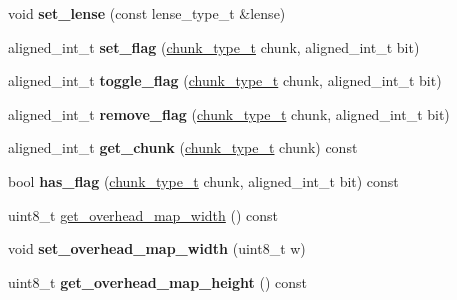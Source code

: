 \begin{DoxyCompactItemize}
void {\bfseries set\+\_\+lense} (const lense\+\_\+type\+\_\+t \&lense)
\item 
\mbox{\label{classmods_1_1player_a5ae234a904fde59efe863101c0fa8569}} 
aligned\+\_\+int\+\_\+t {\bfseries set\+\_\+flag} (\hyperlink{classmods_1_1player_a98e6f1c1529e3034d1c6e9a48475bc6b}{chunk\+\_\+type\+\_\+t} chunk, aligned\+\_\+int\+\_\+t bit)
\item 
\mbox{\label{classmods_1_1player_a8e3f6ee3fec9c25cdfbc8900dd7dd8de}} 
aligned\+\_\+int\+\_\+t {\bfseries toggle\+\_\+flag} (\hyperlink{classmods_1_1player_a98e6f1c1529e3034d1c6e9a48475bc6b}{chunk\+\_\+type\+\_\+t} chunk, aligned\+\_\+int\+\_\+t bit)
\item 
\mbox{\label{classmods_1_1player_ac82ced6921af9adc44e20e8d35bb423f}} 
aligned\+\_\+int\+\_\+t {\bfseries remove\+\_\+flag} (\hyperlink{classmods_1_1player_a98e6f1c1529e3034d1c6e9a48475bc6b}{chunk\+\_\+type\+\_\+t} chunk, aligned\+\_\+int\+\_\+t bit)
\item 
\mbox{\label{classmods_1_1player_a4a136f9de177df78bf7a8253e1068082}} 
aligned\+\_\+int\+\_\+t {\bfseries get\+\_\+chunk} (\hyperlink{classmods_1_1player_a98e6f1c1529e3034d1c6e9a48475bc6b}{chunk\+\_\+type\+\_\+t} chunk) const
\item 
\mbox{\label{classmods_1_1player_a553683497aed80e8768107b9c12b544e}} 
bool {\bfseries has\+\_\+flag} (\hyperlink{classmods_1_1player_a98e6f1c1529e3034d1c6e9a48475bc6b}{chunk\+\_\+type\+\_\+t} chunk, aligned\+\_\+int\+\_\+t bit) const
\item 
uint8\+\_\+t \hyperlink{classmods_1_1player_a05b78e56ec3b207c2ebd5396b4e3bd65}{get\+\_\+overhead\+\_\+map\+\_\+width} () const
\item 
\mbox{\label{classmods_1_1player_a6bbc06149ecfe73e3968a8872e797707}} 
void {\bfseries set\+\_\+overhead\+\_\+map\+\_\+width} (uint8\+\_\+t w)
\item 
\mbox{\label{classmods_1_1player_a34400d516c566141a85314a5f1965c16}} 
uint8\+\_\+t {\bfseries get\+\_\+overhead\+\_\+map\+\_\+height} () const
\item 
\mbox{\label{classmods_1_1player_afc76c62b352e1712285f9d4a413842fb}} 

\end{DoxyCompactItemize}
